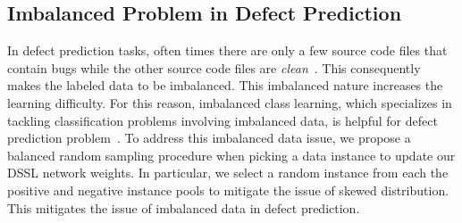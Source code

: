 




\subsection{Imbalanced Problem in Defect Prediction}
\label{sec:imbalanced}
In defect prediction tasks, often times there are only a few source code files that contain bugs while the other source code files are \textit{clean}~\cite{khoshgoftaar2010attribute}. This consequently makes the labeled data to be imbalanced. This imbalanced nature increases the learning difficulty. For this reason, imbalanced class learning, which specializes in tackling classification problems involving imbalanced data, is helpful for defect prediction problem~\cite{wang2013using}. To address this imbalanced data issue, we propose a balanced random sampling procedure when picking a data instance to update our DSSL network weights. In particular, we select a random instance from each the positive and negative instance pools to mitigate the issue of skewed distribution. This mitigates the issue of imbalanced data in defect prediction. 


